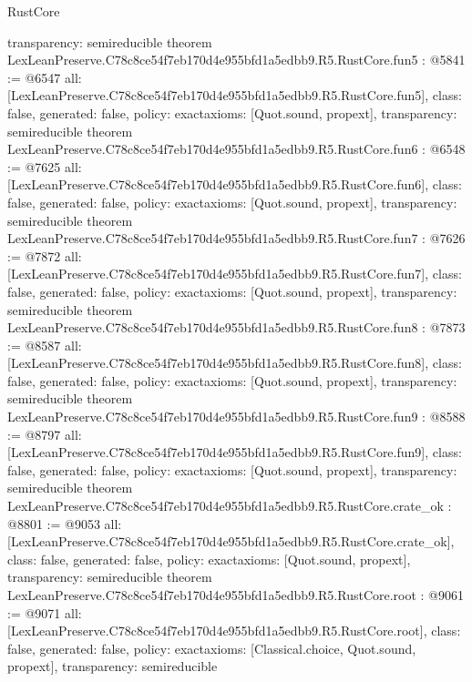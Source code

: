 \begin{lexlean}{RustCore}
\begin{coremodule}
{  transparency: semireducible
}
theorem LexLeanPreserve.C78c8ce54f7eb170d4e955bfd1a5edbb9.R5.RustCore.fun5 : @5841 := @6547 {
  all: [LexLeanPreserve.C78c8ce54f7eb170d4e955bfd1a5edbb9.R5.RustCore.fun5],
  class: false,
  generated: false,
  policy: exact{axioms: [Quot.sound, propext]},
  transparency: semireducible
}
theorem LexLeanPreserve.C78c8ce54f7eb170d4e955bfd1a5edbb9.R5.RustCore.fun6 : @6548 := @7625 {
  all: [LexLeanPreserve.C78c8ce54f7eb170d4e955bfd1a5edbb9.R5.RustCore.fun6],
  class: false,
  generated: false,
  policy: exact{axioms: [Quot.sound, propext]},
  transparency: semireducible
}
theorem LexLeanPreserve.C78c8ce54f7eb170d4e955bfd1a5edbb9.R5.RustCore.fun7 : @7626 := @7872 {
  all: [LexLeanPreserve.C78c8ce54f7eb170d4e955bfd1a5edbb9.R5.RustCore.fun7],
  class: false,
  generated: false,
  policy: exact{axioms: [Quot.sound, propext]},
  transparency: semireducible
}
theorem LexLeanPreserve.C78c8ce54f7eb170d4e955bfd1a5edbb9.R5.RustCore.fun8 : @7873 := @8587 {
  all: [LexLeanPreserve.C78c8ce54f7eb170d4e955bfd1a5edbb9.R5.RustCore.fun8],
  class: false,
  generated: false,
  policy: exact{axioms: [Quot.sound, propext]},
  transparency: semireducible
}
theorem LexLeanPreserve.C78c8ce54f7eb170d4e955bfd1a5edbb9.R5.RustCore.fun9 : @8588 := @8797 {
  all: [LexLeanPreserve.C78c8ce54f7eb170d4e955bfd1a5edbb9.R5.RustCore.fun9],
  class: false,
  generated: false,
  policy: exact{axioms: [Quot.sound, propext]},
  transparency: semireducible
}
theorem LexLeanPreserve.C78c8ce54f7eb170d4e955bfd1a5edbb9.R5.RustCore.crate_ok : @8801 := @9053 {
  all: [LexLeanPreserve.C78c8ce54f7eb170d4e955bfd1a5edbb9.R5.RustCore.crate_ok],
  class: false,
  generated: false,
  policy: exact{axioms: [Quot.sound, propext]},
  transparency: semireducible
}
theorem LexLeanPreserve.C78c8ce54f7eb170d4e955bfd1a5edbb9.R5.RustCore.root : @9061 := @9071 {
  all: [LexLeanPreserve.C78c8ce54f7eb170d4e955bfd1a5edbb9.R5.RustCore.root],
  class: false,
  generated: false,
  policy: exact{axioms: [Classical.choice, Quot.sound, propext]},
  transparency: semireducible
}


\end{coremodule}
\end{lexlean}
